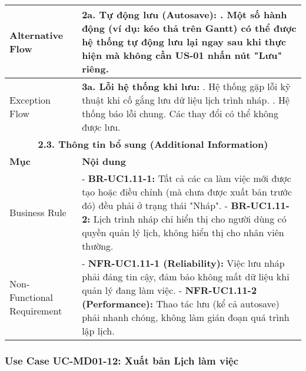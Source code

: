 \begin{longtable}{|m{4cm}|p{11cm}|}
\hline
Alternative Flow & \textbf{2a. Tự động lưu (Autosave):} \newline    1. Một số hành động (ví dụ: kéo thả trên Gantt) có thể được hệ thống tự động lưu lại ngay sau khi thực hiện mà không cần US-01 nhấn nút "Lưu" riêng. \\
\hline
Exception Flow & \textbf{3a. Lỗi hệ thống khi lưu:} \newline    1. Hệ thống gặp lỗi kỹ thuật khi cố gắng lưu dữ liệu lịch trình nháp. \newline    2. Hệ thống báo lỗi chung. Các thay đổi có thể không được lưu. \\
\hline
\multicolumn{2}{|c|}{\textbf{2.3. Thông tin bổ sung (Additional Information)}} \\
\hline
\textbf{Mục} & \textbf{Nội dung} \\
\hline
Business Rule & - \textbf{BR-UC1.11-1:} Tất cả các ca làm việc mới được tạo hoặc điều chỉnh (mà chưa được xuất bản trước đó) đều phải ở trạng thái "Nháp". \newline - \textbf{BR-UC1.11-2:} Lịch trình nháp chỉ hiển thị cho người dùng có quyền quản lý lịch, không hiển thị cho nhân viên thường. \\
\hline
Non-Functional Requirement & - \textbf{NFR-UC1.11-1 (Reliability):} Việc lưu nháp phải đáng tin cậy, đảm bảo không mất dữ liệu khi quản lý đang làm việc. \newline - \textbf{NFR-UC1.11-2 (Performance):} Thao tác lưu (kể cả autosave) phải nhanh chóng, không làm gián đoạn quá trình lập lịch. \\
\hline
\end{longtable}

\subsubsection{Use Case UC-MD01-12: Xuất bản Lịch làm việc}

